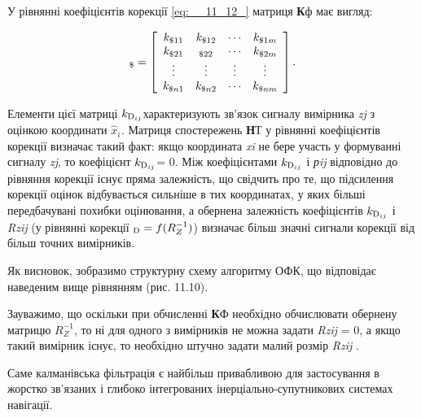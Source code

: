 У рівнянні коефіцієнтів корекції \eqref{eq:__11_12_} матриця \textbf{К}ф має 
вигляд:

\[_{{\rm \$ }} =\left[\begin{array}{cccc} {k_{{\rm \$ }11} } & {k_{{\rm \$ }12} } 
& {\cdots } & {k_{{\rm \$ }1m} } \\ {k_{{\rm \$ }21} } & {_{{\rm \$ }22} } & {\cdots 
} & {k_{{\rm \$ }2m} } \\ {\vdots } & {\vdots } & {\vdots } & {\vdots } \\ {k_{{
\rm \$ }n1} } & {k_{{\rm \$ }n2} } & {\cdots } & {k_{{\rm \$ }nm} } \end{array}\right].\] 

Елементи 
цієї матриці $k_{{\rm D}_{ij} } $характеризують зв'язок сигналу вимірника \textit{zj }з 
оцінкою координати \textit{$\hat{x}_{i} $.} Матриця спостережень \textbf{Н}Т у рівнянні 
коефіцієнтів корекції визначає такий факт: якщо координата \textit{xi} не бере участь 
у формуванні сигналу \textit{zj}, то коефіцієнт $k_{{\rm D}_{ij} } $= 0. Між коефіцієнтами $k_{{
\rm D}_{ij} } $ і  \textit{рij}  відповідно до  рівняння корекції існує пряма залежність, 
що свідчить про те, що підсилення корекції оцінок відбувається сильніше в тих координатах, 
у яких більші передбачувані похибки оцінювання, а обернена залежність коефіцієнтів $k_{{
\rm D}_{ij} } $ і  \textit{Rzij} (у рівнянні корекції $_{{\rm D}} =f(R_{Z}^{-1} )$) 
визначає більш значні сигнали корекції від більш точних вимірників.

Як висновок, зобразимо структурну схему алгоритму ОФК, що відповідає наведеним вище 
рівнянням (рис. 11.10).

Зауважимо, що оскільки при  обчисленні \textbf{К}Ф необхідно обчислювати обернену 
матрицю $R_{Z}^{-1} $, то ні для одного з вимірників не можна задати \textit{Rzij} = 
0, а якщо такий вимірник існує, то необхідно штучно задати малий розмір \textit{Rzij} .

Саме калманівська фільтрація є найбільш привабливою для застосування в жорстко зв'язаних 
і глибоко інтегрованих інерціально-супутникових системах навігації. 




